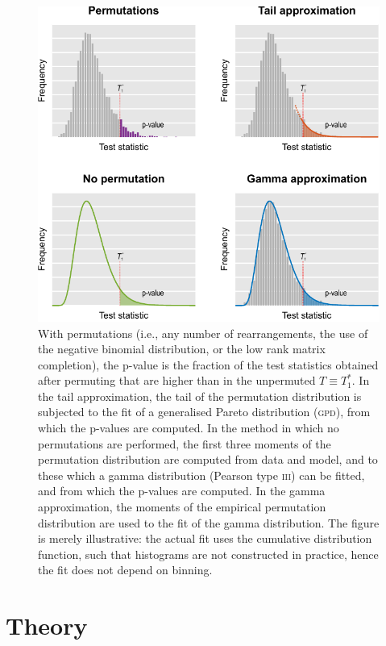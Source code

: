 \begin{figure}[!tp]
\begin{center}
\includegraphics{figures/curvefits.pdf}
\end{center}
\caption[Illustration of some of the acceleration strategies.]{With permutations (i.e., any number of rearrangements, the use of the negative binomial distribution, or the low rank matrix completion), the p-value is the fraction of the test statistics obtained after permuting that are higher than in the unpermuted $T \equiv T_1^*$. In the tail approximation, the tail of the permutation distribution is subjected to the fit of a generalised Pareto distribution (\textsc{gpd}), from which the p-values are computed. In the method in which no permutations are performed, the first three moments of the permutation distribution are computed from data and model, and to these which a gamma distribution (Pearson type \textsc{iii}) can be fitted, and from which the p-values are computed. In the gamma approximation, the moments of the empirical permutation distribution are used to the fit of the gamma distribution. The figure is merely illustrative: the actual fit uses the cumulative distribution function, such that histograms are not constructed in practice, hence the fit does not depend on binning.}
\label{fig:curvefits}
\end{figure}

\section{Theory}
\label{sec:accel:theory}

